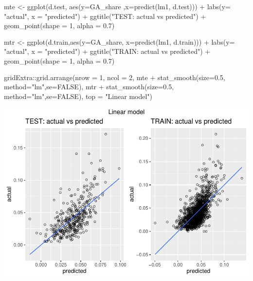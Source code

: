 \documentclass[
]{article}
\newenvironment{Shaded}{\begin{snugshade}}{\end{snugshade}}
\newcommand{\AttributeTok}[1]{\textcolor[rgb]{0.77,0.63,0.00}{#1}}
\newcommand{\ConstantTok}[1]{\textcolor[rgb]{0.00,0.00,0.00}{#1}}
\newcommand{\DecValTok}[1]{\textcolor[rgb]{0.00,0.00,0.81}{#1}}
\newcommand{\FloatTok}[1]{\textcolor[rgb]{0.00,0.00,0.81}{#1}}
\newcommand{\FunctionTok}[1]{\textcolor[rgb]{0.00,0.00,0.00}{#1}}
\newcommand{\NormalTok}[1]{#1}
\newcommand{\OtherTok}[1]{\textcolor[rgb]{0.56,0.35,0.01}{#1}}
\newcommand{\SpecialCharTok}[1]{\textcolor[rgb]{0.00,0.00,0.00}{#1}}
\newcommand{\StringTok}[1]{\textcolor[rgb]{0.31,0.60,0.02}{#1}}
\begin{document}
\begin{Shaded}
\begin{Highlighting}[]
\NormalTok{mte }\OtherTok{\textless{}{-}} \FunctionTok{ggplot}\NormalTok{(d.test, }\FunctionTok{aes}\NormalTok{(}\AttributeTok{y=}\NormalTok{GA\_share ,}\AttributeTok{x=}\FunctionTok{predict}\NormalTok{(lm1, d.test))) }\SpecialCharTok{+}
  \FunctionTok{labs}\NormalTok{(}\AttributeTok{y=} \StringTok{"actual"}\NormalTok{, }\AttributeTok{x =} \StringTok{"predicted"}\NormalTok{) }\SpecialCharTok{+} \FunctionTok{ggtitle}\NormalTok{(}\StringTok{"TEST: actual vs predicted"}\NormalTok{) }\SpecialCharTok{+} 
  \FunctionTok{geom\_point}\NormalTok{(}\AttributeTok{shape =} \DecValTok{1}\NormalTok{, }\AttributeTok{alpha =} \FloatTok{0.7}\NormalTok{)}

\NormalTok{mtr }\OtherTok{\textless{}{-}} \FunctionTok{ggplot}\NormalTok{(d.train,}\FunctionTok{aes}\NormalTok{(}\AttributeTok{y=}\NormalTok{GA\_share, }\AttributeTok{x=}\FunctionTok{predict}\NormalTok{(lm1, d.train))) }\SpecialCharTok{+}
  \FunctionTok{labs}\NormalTok{(}\AttributeTok{y=} \StringTok{"actual"}\NormalTok{, }\AttributeTok{x =} \StringTok{"predicted"}\NormalTok{) }\SpecialCharTok{+} \FunctionTok{ggtitle}\NormalTok{(}\StringTok{"TRAIN: actual vs predicted"}\NormalTok{) }\SpecialCharTok{+} 
  \FunctionTok{geom\_point}\NormalTok{(}\AttributeTok{shape =} \DecValTok{1}\NormalTok{, }\AttributeTok{alpha =} \FloatTok{0.7}\NormalTok{)}

\NormalTok{gridExtra}\SpecialCharTok{::}\FunctionTok{grid.arrange}\NormalTok{(}\AttributeTok{nrow =} \DecValTok{1}\NormalTok{, }\AttributeTok{ncol =} \DecValTok{2}\NormalTok{, mte }\SpecialCharTok{+} 
                        \FunctionTok{stat\_smooth}\NormalTok{(}\AttributeTok{size=}\FloatTok{0.5}\NormalTok{, }\AttributeTok{method=}\StringTok{"lm"}\NormalTok{,}\AttributeTok{se=}\ConstantTok{FALSE}\NormalTok{), }
\NormalTok{                        mtr }\SpecialCharTok{+} \FunctionTok{stat\_smooth}\NormalTok{(}\AttributeTok{size=}\FloatTok{0.5}\NormalTok{, }\AttributeTok{method=}\StringTok{"lm"}\NormalTok{,}\AttributeTok{se=}\ConstantTok{FALSE}\NormalTok{),}
                        \AttributeTok{top =} \StringTok{"Linear model"}\NormalTok{)}
\end{Highlighting}
\end{Shaded}

\includegraphics{Lin_Mod_Clus_Anal_files/figure-latex/unnamed-chunk-22-1.pdf}
\end{document}
